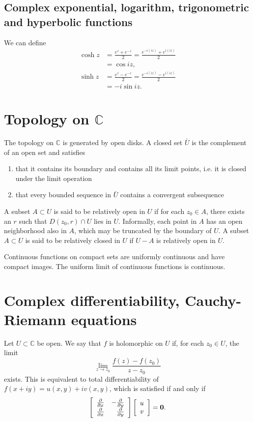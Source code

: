 \documentclass{article}
\begin{document}
\subsection{Complex exponential, logarithm,
                  trigonometric and hyperbolic functions}

We can define
\begin{align*}
   \cosh z
&= \frac{e^z + e^{-z}}{2}
 = \frac{e^{-i(iz)} + e^{i(iz)}}{2} \\
&= \cos iz, \\
   \sinh z
&= \frac{e^z - e^{-z}}{2}
 = \frac{e^{-i(iz)} - e^{i(iz)}}{2} \\
&= -i \sin iz.
\end{align*}

\section{Topology on $\mathbb{C}$}

The topology on $\mathbb{C}$ is generated by open disks.
A closed set $\bar{U}$ is the complement of an open set
and satisfies
\begin{enumerate}
  \item{
    that it contains its boundary and contains all its
    limit points, i.e. it is closed under the limit operation
  }
  \item{
    that every bounded sequence in $\bar{U}$ contains a
    convergent subsequence
  }
\end{enumerate}

A subset $A \subset U$ is said to be relatively open in $U$ if
for each $z_0 \in A$, there exists an $r$ such that
$D(z_0, r) \cap U$ lies in $U$. Informally, each point in $A$ has an
open neighborhood also in $A$, which may be truncated by the boundary
of $U$.
A subset $A \subset U$ is said to be relatively closed in $U$
if $U - A$ is relatively open in $U$.

Continuous functions on compact sets are uniformly continuous and have
compact images. The uniform limit of continuous functions is continuous.

\section{Complex differentiability, Cauchy-Riemann equations}

Let $U \subset \mathbb{C}$ be open. We say that $f$ is
holomorphic on $U$ if, for each $z_0 \in U$, the limit
$$
  \lim_{z \to z_0}
    \frac{f(z) - f(z_0)}
         {z - z_0}
$$
exists. This is equivalent to total differentiability of
$f(x + i y) = u(x, y) + i v(x, y)$, which is satisfied if and
only if
$$
  \left[
    \begin{array}{r r}
       \frac{\partial}{\partial x}
    & -\frac{\partial}{\partial y} \\
       \frac{\partial}{\partial x}
    &  \frac{\partial}{\partial y}
    \end{array}
  \right]
  \left[
    \begin{array}{c}
      u \\
      v
    \end{array}
  \right]
= \mathbf{0}.
$$
\end{document}
